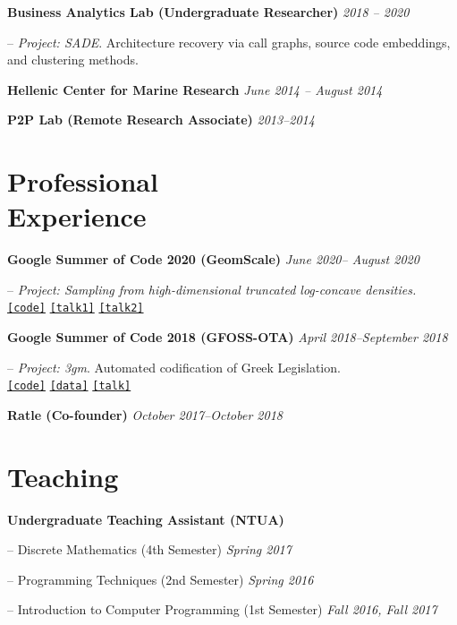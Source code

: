 \documentclass[margin]{res}
\newcommand{\field}[2]{\noindent \textbf{#1} \hfill #2 \\}
\newcommand{\specialurl}[2]{\href {#2} {\texttt{[#1]}}}
\newcommand{\code}[1]{\specialurl {code} {#1}}
\newcommand{\data}[1]{\specialurl {data} {#1}}
\newcommand{\talk}[1]{\specialurl {talk} {#1}}
\begin{document}
\begin{resume}
\textbf{Business Analytics Lab (Undergraduate Researcher)} \hfill \emph{2018 -- 2020}
\begin{compactitem}
\item[--] \emph{Project: SADE}. Architecture recovery via call graphs, source code embeddings, and clustering methods.
\end{compactitem}

\textbf{Hellenic Center for Marine Research} \hfill \emph{June 2014 -- August 2014}

\textbf{P2P Lab (Remote Research Associate)} \hfill \emph{2013--2014}

 
\section{Professional \\ Experience}
\field{Google Summer of Code 2020 (GeomScale)}  {\emph{June 2020-- August 2020}}
\begin{compactitem}
\item[--] \emph{Project: Sampling from high-dimensional truncated log-concave densities.} \\ \code{https://GeomScale/volesti} \specialurl{talk1}{https://www.youtube.com/watch?v=P7YfC8Nn6sY} \specialurl{talk2}{https://www.cs.utah.edu/~jeffp/WaGoML/index.html}
\end{compactitem}

\field{Google Summer of Code 2018 (GFOSS-OTA)}  {\emph{April 2018--September 2018}}
\begin{compactitem}
\item[--] \emph{Project: 3gm}. Automated codification of Greek Legislation. \\ \code{https://github.com/eellak/gsoc2018-3gm} \data{https://archive.org/details/greekgovernmentgazette} \talk{https://www.youtube.com/watch?v=_UIGsy85Ehw}
\end{compactitem}

\field{Ratle (Co-founder)} {\emph{October 2017--October 2018}}

\section{Teaching} 
\textbf{Undergraduate Teaching Assistant (NTUA)}
\begin{compactitem}
    \item[--] Discrete Mathematics (4th Semester) \hfill \emph{Spring 2017}
    \item[--] Programming Techniques (2nd Semester) \hfill \emph{Spring 2016}
    \item[--] Introduction to Computer Programming (1st Semester) \hfill \emph{Fall 2016, Fall 2017}
\end{compactitem}



\end{resume}
\end{document}
